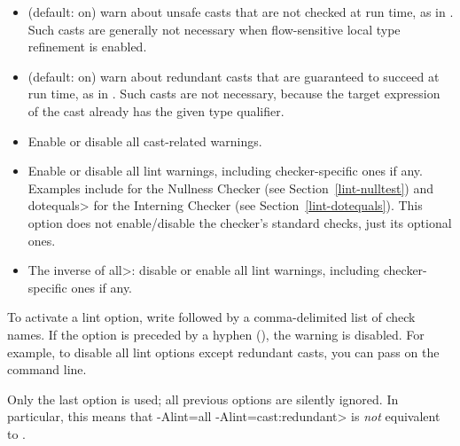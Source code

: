 \begin{itemize}

\item
   (default: on) warn about unsafe casts that are not
  checked at run time, as in .  Such casts
  are generally not necessary when flow-sensitive local type refinement is
  enabled.

\item
   (default: on) warn about redundant
  casts that are guaranteed to succeed at run time,
  as in .  Such casts are not necessary,
  because the target expression of the cast already has the given type
  qualifier.

\item
   Enable or disable all cast-related warnings.

\item
\begin{sloppypar}
   Enable or disable all lint warnings, including
  checker-specific ones if any.  Examples include  for the
  Nullness Checker (see Section~\ref{lint-nulltest}) and \<dotequals> for
  the Interning Checker (see Section~\ref{lint-dotequals}).  This option
  does not enable/disable the checker's standard checks, just its optional
  ones.
\end{sloppypar}

\item
   The inverse of \<all>:  disable or enable all lint warnings,
  including checker-specific ones if any.

\end{itemize}


\noindent
To activate a lint option, write  followed by a
comma-delimited list of check names.  If the option is preceded by a
hyphen (\code{-}), the warning is disabled.  For example, to disable all
lint options except redundant casts, you can pass
 on the command line.

Only the last  option is used; all previous 
options are silently ignored.  In particular, this means that \<-Alint=all
-Alint=cast:redundant> is \emph{not} equivalent to
.


